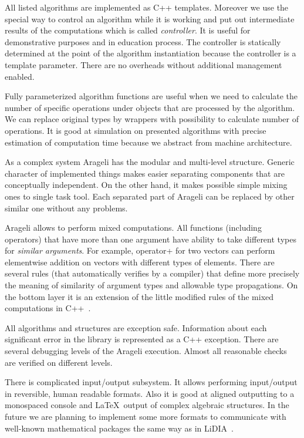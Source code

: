 \documentclass{llncs}
\begin{document}
All listed algorithms are implemented as C++ templates. Moreover we use the special way to control an algorithm while it is working and put out intermediate results of the computations which is called {\em controller}. It is useful for demonstrative purposes and in education process. The controller is statically determined at the point of the algorithm instantiation because the controller is a template parameter. There are no overheads without additional management enabled.

Fully parameterized algorithm functions are useful when we need to calculate the number of specific operations under objects that are processed by the algorithm. We can replace original types by wrappers with possibility to calculate number of operations. It is good at simulation on presented algorithms with precise estimation of computation time because we abstract from machine architecture.

As a complex system Arageli has the modular and multi-level structure. Generic character of implemented things makes easier separating components that are conceptually independent. On the other hand, it makes possible simple mixing ones to single task tool. Each separated part of Arageli can be replaced by other similar one without any problems.

Arageli allows to perform mixed computations. All functions (including operators) that have more than one argument have ability to take different types for {\em similar arguments}. For example, operator+ for two vectors can perform elementwise addition on vectors with different types of elements. There are several rules (that automatically verifies by a compiler) that define more precisely the meaning of similarity of argument types and allowable type propagations. On the bottom layer it is an extension of the little modified rules of the mixed computations in C++~\cite{ISOCPP}.

All algorithms and structures are exception safe. Information about each significant error in the library is represented as a C++ exception. There are several debugging levels of the Arageli execution. Almost all reasonable checks are verified on different levels.

There is complicated in\-put/out\-put subsystem. It allows performing in\-put/out\-put in reversible, human readable formats. Also it is good at aligned outputting to a monospaced console and \LaTeX\ output of complex algebraic structures. In the future we are planning to implement some more formats to communicate with well-known mathematical packages the same way as in LiDIA~\cite{LiDIA}.
\end{document}
